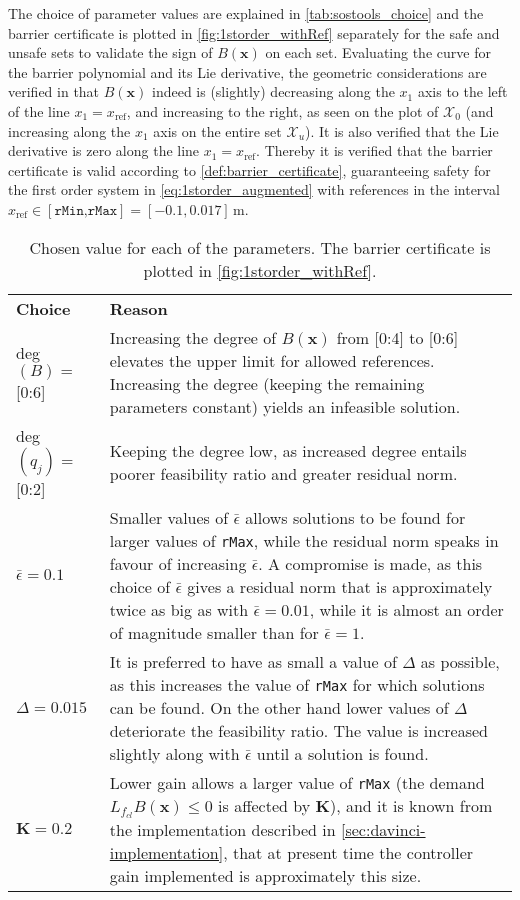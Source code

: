 The choice of parameter values are explained in \autoref{tab:sostools_choice} and the barrier certificate is plotted in \autoref{fig:1storder_withRef} separately for the safe and unsafe sets to validate the sign of $B(\mathbf{x})$ on each set. 
Evaluating the curve for the barrier polynomial and its Lie derivative,  the geometric considerations are verified in that $B(\mathbf{x})$ indeed is (slightly) decreasing along the $x_1$ axis to the left of the line $x_1=x_\text{ref}$, and increasing to the right, as seen on the plot of $\mathcal{X}_0$ (and increasing along the $x_1$ axis on the entire set $\mathcal{X}_u$). It is also verified that the Lie derivative is zero along the line $x_1=x_\text{ref}$. Thereby it is verified that the barrier certificate is valid according to \autoref{def:barrier_certificate},  guaranteeing  safety for the first order system in \autoref{eq:1storder_augmented} with references in the interval $x_\text{ref}\in [\texttt{rMin,rMax}]=[-0.1,0.017]$\,m.



\begin{table}[H]
	\begin{tabularx}{\textwidth}{l X}
		\rowcolor{HeaderBlue}
		\textbf{Choice} & \textbf{Reason}\\
		deg$(B)=$ [0:6] & Increasing the degree of $B(\mathbf{x})$ from [0:4] to [0:6] elevates the upper limit for allowed references. Increasing the degree (keeping the remaining parameters constant) yields an infeasible solution. \\
		\rowcolor{textBlue}
		deg$(q_j)=$ [0:2] & Keeping the degree low, as increased degree entails poorer feasibility ratio and greater residual norm.\\
		$\bar{\epsilon}=0.1$ & Smaller values of  $\bar{\epsilon}$ allows solutions to be found for larger values of \texttt{rMax}, while the residual norm  speaks in favour of increasing $\bar{\epsilon}$. A compromise is made, as this choice of $\bar{\epsilon}$ gives a residual norm that is approximately twice as big as with $\bar{\epsilon}=0.01$, while it is almost an order of magnitude smaller than for $\bar{\epsilon}=1$.\\
		\rowcolor{textBlue}
		$\Delta=0.015$ & It is preferred to have as small a value of $\Delta$ as possible, as this increases the value of \texttt{rMax} for which solutions can be found. On the other hand lower  values of $\Delta$ deteriorate the feasibility ratio. The value is increased slightly along with $\bar{\epsilon}$ until a solution is found. \\
		$\textbf{K}=0.2$ & Lower gain allows a larger value of \texttt{rMax} (the demand $L_{f_{cl}}B(\textbf{x}) \leq 0$ is affected by $\textbf{K}$), and it is known from the implementation described in \autoref{sec:davinci-implementation}, that at present time the controller gain implemented is approximately this size.
	\end{tabularx}
	\caption{Chosen value for each of the parameters. The barrier certificate is plotted in \autoref{fig:1storder_withRef}.}
	\label{tab:sostools_choice}
\end{table}


